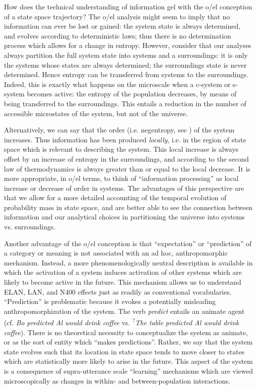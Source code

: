How does the technical understanding of information gel with the o/el conception of a state space trajectory? The o/el analysis might seem to imply that no information can ever be lost or gained: the system state is always determined, and evolves according to deterministic laws; thus there is no determination process which allows for a change in entropy. However, consider that our analyses always partition the full system state into systems and a surroundings: it is only the systems whose states are always determined; the surroundings state is never determined. Hence entropy can be transferred from systems to the surroundings. Indeed, this is exactly what happens on the microscale when a c-system or s-system becomes active: the entropy of the population decreases, by means of being transferred to the surroundings. This entails a reduction in the number of accessible microstates of the system, but not of the universe.

Alternatively, we can say that the order (i.e. negentropy, see \citealt{Schrödinger1944}) of the system increases. Thus information has been produced \textit{locally}, i.e. in the region of state space which is relevant to describing the system. This local increase is always offset by an increase of entropy in the surroundings, and according to the second law of thermodynamics is always greater than or equal to the local decrease. It is more appropriate, in o/el terms, to think of “information processing” as local increase or decrease of order in systems. The advantages of this perspective are that we allow for a more detailed accounting of the temporal evolution of probability mass in state space, and are better able to see the connection between information and our analytical choices in partitioning the universe into systems vs. surroundings. 

Another advantage of the o/el conception is that “expectation” or “prediction” of a category or meaning is not associated with an ad hoc, anthropomorphic mechanism. Instead, a more phenomenologically neutral description is available in which the activation of a system induces activation of other systems which are likely to become active in the future. This mechanism allows us to understand ELAN, LAN, and N400 effects just as readily as conventional vocabularies. “Prediction” is problematic because it evokes a potentially misleading anthropomorphization of the system. The verb \textit{predict} entails an animate agent (cf. \textit{Bo predicted Al would drink coffee} vs. \textsuperscript{?}\textit{The table predicted Al would drink coffee}). There is no theoretical necessity to conceptualize the system as animate, or as the sort of entity which “makes predictions”. Rather, we say that the system state evolves such that its location in state space tends to move closer to states which are statistically more likely to arise in the future. This aspect of the system is a consequence of supra-utterance scale “learning” mechanisms which are viewed microscopically as changes in within- and between-population interactions.

